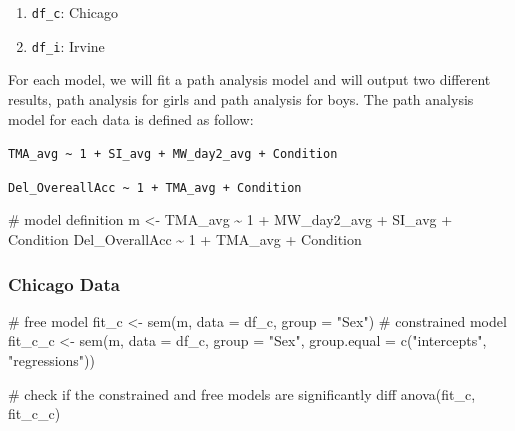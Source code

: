 \documentclass[
  letterpaper,
  DIV=11,
  numbers=noendperiod]{scrartcl}
\newenvironment{Shaded}{\begin{snugshade}}{\end{snugshade}}
\newcommand{\AttributeTok}[1]{\textcolor[rgb]{0.40,0.45,0.13}{#1}}
\newcommand{\CommentTok}[1]{\textcolor[rgb]{0.37,0.37,0.37}{#1}}
\newcommand{\FunctionTok}[1]{\textcolor[rgb]{0.28,0.35,0.67}{#1}}
\newcommand{\NormalTok}[1]{\textcolor[rgb]{0.00,0.23,0.31}{#1}}
\newcommand{\OtherTok}[1]{\textcolor[rgb]{0.00,0.23,0.31}{#1}}
\newcommand{\StringTok}[1]{\textcolor[rgb]{0.13,0.47,0.30}{#1}}
\providecommand{\tightlist}{%
  \setlength{\itemsep}{0pt}\setlength{\parskip}{0pt}}\usepackage{longtable,booktabs,array}
\begin{document}
\begin{enumerate}
\def\labelenumi{\arabic{enumi}.}
\tightlist
\item
  \texttt{df\_c}: Chicago
\item
  \texttt{df\_i}: Irvine
\end{enumerate}

For each model, we will fit a path analysis model and will output two
different results, path analysis for girls and path analysis for boys.
The path analysis model for each data is defined as follow:

\texttt{TMA\_avg\ \textasciitilde{}\ 1\ +\ SI\_avg\ +\ MW\_day2\_avg\ +\ Condition}

\texttt{Del\_OvereallAcc\ \textasciitilde{}\ 1\ +\ TMA\_avg\ +\ Condition}

\begin{Shaded}
\begin{Highlighting}[]
\CommentTok{\# model definition}
\NormalTok{m }\OtherTok{\textless{}{-}} \StringTok{\textquotesingle{}}
\StringTok{  TMA\_avg \textasciitilde{} 1 + MW\_day2\_avg + SI\_avg + Condition}
\StringTok{  Del\_OverallAcc \textasciitilde{} 1 + TMA\_avg + Condition}
\StringTok{\textquotesingle{}}
\end{Highlighting}
\end{Shaded}

\hypertarget{chicago-data}{%
\subsubsection{Chicago Data}\label{chicago-data}}

\begin{Shaded}
\begin{Highlighting}[]
\CommentTok{\# free model}
\NormalTok{fit\_c }\OtherTok{\textless{}{-}} \FunctionTok{sem}\NormalTok{(m, }\AttributeTok{data =}\NormalTok{ df\_c, }\AttributeTok{group =} \StringTok{"Sex"}\NormalTok{)}
\CommentTok{\# constrained model}
\NormalTok{fit\_c\_c }\OtherTok{\textless{}{-}} \FunctionTok{sem}\NormalTok{(m, }\AttributeTok{data =}\NormalTok{ df\_c, }\AttributeTok{group =} \StringTok{"Sex"}\NormalTok{,}
                \AttributeTok{group.equal =} \FunctionTok{c}\NormalTok{(}\StringTok{"intercepts"}\NormalTok{, }\StringTok{"regressions"}\NormalTok{))}
\end{Highlighting}
\end{Shaded}

\begin{Shaded}
\begin{Highlighting}[]
\CommentTok{\# check if the constrained and free models are significantly diff}
\FunctionTok{anova}\NormalTok{(fit\_c, fit\_c\_c)}
\end{Highlighting}
\end{Shaded}
\end{document}
